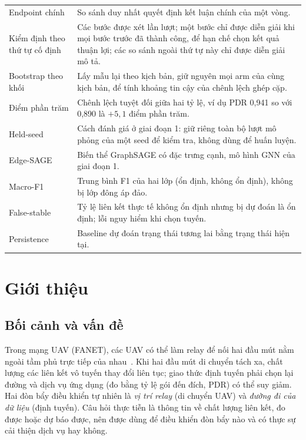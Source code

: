 \documentclass[12pt,a4paper]{report}
\begin{document}
{\begin{longtable}{@{}P{4.2cm}p{11.2cm}@{}}
Endpoint chính&So sánh duy nhất quyết định kết luận chính của một vòng.\\
Kiểm định theo thứ tự cố định&Các bước được xét lần lượt; một bước chỉ được diễn giải khi mọi bước trước đã thành công, để hạn chế chọn kết quả thuận lợi; các so sánh ngoài thứ tự này chỉ được diễn giải mô tả.\\
Bootstrap theo khối&Lấy mẫu lại theo kịch bản, giữ nguyên mọi arm của cùng kịch bản, để tính khoảng tin cậy của chênh lệch ghép cặp.\\
Điểm phần trăm&Chênh lệch tuyệt đối giữa hai tỷ lệ, ví dụ PDR 0,941 so với 0,890 là $+5{,}1$ điểm phần trăm.\\
Held-seed&Cách đánh giá ở giai đoạn 1: giữ riêng toàn bộ lượt mô phỏng của một seed để kiểm tra, không dùng để huấn luyện.\\
Edge-SAGE&Biến thể GraphSAGE có đặc trưng cạnh, mô hình GNN của giai đoạn 1.\\
Macro-F1&Trung bình F1 của hai lớp (ổn định, không ổn định), không bị lớp đông áp đảo.\\
False-stable&Tỷ lệ liên kết thực tế không ổn định nhưng bị dự đoán là ổn định; lỗi nguy hiểm khi chọn tuyến.\\
Persistence&Baseline dự đoán trạng thái tương lai bằng trạng thái hiện tại.\\
\bottomrule
\end{longtable}
}
\clearpage
{}

\chapter{Giới thiệu}
\section{Bối cảnh và vấn đề}
Trong mạng UAV (FANET), các UAV có thể làm relay để nối hai đầu mút nằm ngoài tầm phủ trực tiếp của nhau~\cite{bekmezci}. Khi hai đầu mút di chuyển tách xa, chất lượng các liên kết vô tuyến thay đổi liên tục; giao thức định tuyến phải chọn lại đường và dịch vụ ứng dụng (đo bằng tỷ lệ gói đến đích, PDR) có thể suy giảm. Hai đòn bẩy điều khiển tự nhiên là \emph{vị trí relay} (di chuyển UAV) và \emph{đường đi của dữ liệu} (định tuyến). Câu hỏi thực tiễn là thông tin về chất lượng liên kết, đo được hoặc dự báo được, nên được dùng để điều khiển đòn bẩy nào và có thực sự cải thiện dịch vụ hay không.
\end{document}
